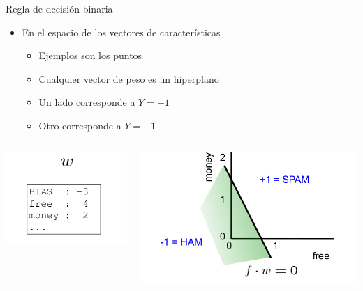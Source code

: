 \documentclass[11pt]{beamer}
\begin{document}
\begin{frame}{Regla de decisi\'on binaria}
\small{
\begin{itemize}
	\item En el espacio de los vectores de caracter\'isticas
	\begin{itemize}
		\item Ejemplos son los puntos
		\item  Cualquier vector de peso es un hiperplano
		\item  Un lado corresponde a $Y = +1$
		\item  Otro corresponde a $Y = -1$
	\end{itemize}
	
\end{itemize}
\begin{columns}
	\begin{column}{0.35\textwidth}
		\includegraphics[scale= 0.32]{TA12.png}
	\end{column}
	\begin{column}{0.65\textwidth}  
		\includegraphics[scale= 0.32]{TA13.png}
		
	\end{column}
\end{columns}

	
	
	}
\end{frame}
\end{document}
